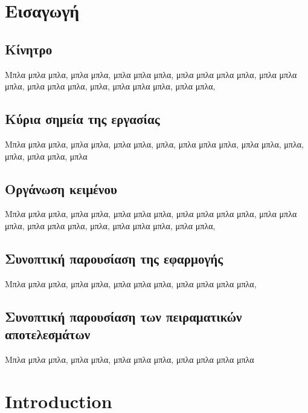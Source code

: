 
\chapter{Εισαγωγή}

\section{Κίνητρο}
  Μπλα μπλα μπλα, μπλα μπλα, μπλα μπλα μπλα, μπλα μπλα μπλα μπλα,
  μπλα μπλα μπλα, μπλα μπλα μπλα, μπλα, μπλα μπλα μπλα, μπλα μπλα,

\section{Κύρια σημεία της εργασίας}
  Μπλα μπλα μπλα, μπλα μπλα, μπλα μπλα, μπλα, μπλα μπλα
  μπλα, μπλα μπλα, μπλα, μπλα, μπλα μπλα, μπλα

\section{Οργάνωση κειμένου}
  Μπλα μπλα μπλα, μπλα μπλα, μπλα μπλα μπλα, μπλα μπλα μπλα μπλα,
  μπλα μπλα μπλα, μπλα μπλα μπλα, μπλα, μπλα μπλα μπλα, μπλα μπλα,

\section{Συνοπτική παρουσίαση της εφαρμογής}
  Μπλα μπλα μπλα, μπλα μπλα, μπλα μπλα μπλα, μπλα μπλα μπλα μπλα,

\section{Συνοπτική παρουσίαση των πειραματικών αποτελεσμάτων}
  Μπλα μπλα μπλα, μπλα μπλα, μπλα μπλα μπλα, μπλα μπλα μπλα μπλα

\setcounter{chapter}{0}

\chapter{Introduction}

